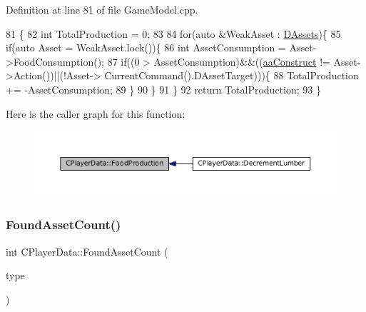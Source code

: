 Definition at line 81 of file Game\+Model.\+cpp.


\begin{DoxyCode}
81                                      \{
82     \textcolor{keywordtype}{int} TotalProduction = 0;
83     
84     \textcolor{keywordflow}{for}(\textcolor{keyword}{auto} &WeakAsset : \hyperlink{classCPlayerData_a1d7dd355facf52db6242e3554373906c}{DAssets})\{
85         \textcolor{keywordflow}{if}(\textcolor{keyword}{auto} Asset = WeakAsset.lock())\{
86             \textcolor{keywordtype}{int} AssetConsumption = Asset->FoodConsumption();
87             \textcolor{keywordflow}{if}((0 > AssetConsumption)&&((\hyperlink{GameDataTypes_8h_ab47668e651a3032cfb9c40ea2d60d670a7ef6b863f66dd7dcc95a199cd758ae1d}{aaConstruct} != Asset->Action())||(!Asset->
      CurrentCommand().DAssetTarget)))\{
88                 TotalProduction += -AssetConsumption;
89             \}
90         \}
91     \}
92     \textcolor{keywordflow}{return} TotalProduction;
93 \}
\end{DoxyCode}
Here is the caller graph for this function\+:
\nopagebreak
\begin{figure}[H]
\begin{center}
\leavevmode
\includegraphics[width=350pt]{classCPlayerData_ae71ad19439d31ba0eb7f59809885ed6d_icgraph}
\end{center}
\end{figure}
\hypertarget{classCPlayerData_ac81c0899651bf3f9962b03ef0d7a2415}{}\label{classCPlayerData_ac81c0899651bf3f9962b03ef0d7a2415} 
\subsubsection{\texorpdfstring{Found\+Asset\+Count()}{FoundAssetCount()}}
{\footnotesize\ttfamily int C\+Player\+Data\+::\+Found\+Asset\+Count (\begin{DoxyParamCaption}\item[{\hyperlink{GameDataTypes_8h_a5600d4fc433b83300308921974477fec}{E\+Asset\+Type}}]{type }\end{DoxyParamCaption})}




